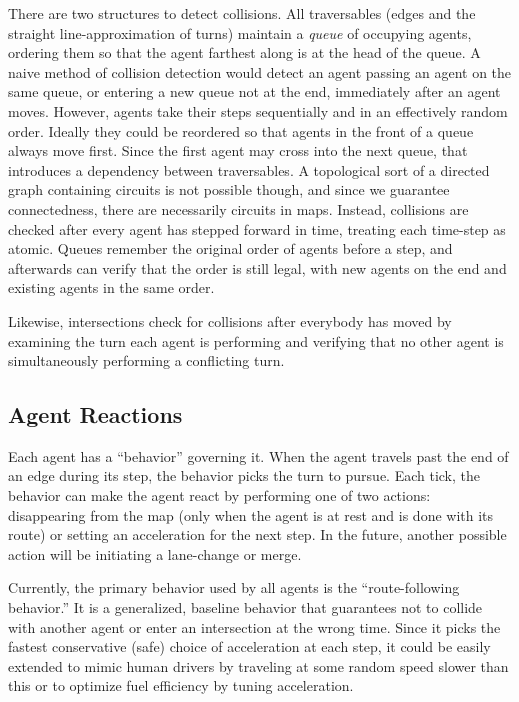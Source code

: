 \documentclass[letterpaper, 10 pt, conference]{ieeeconf}  %
\begin{document}
There are two structures to detect collisions. All traversables (edges and the
straight line-approximation of turns) maintain a \emph{queue} of occupying
agents, ordering them so that the agent farthest along is at the head of the
queue. A naive method of collision detection would detect an agent passing an
agent on the same queue, or entering a new queue not at the end, immediately
after an agent moves. However, agents take their steps sequentially and in an
effectively random order. Ideally they could be reordered so that agents in the
front of a queue always move first. Since the first agent may cross into the
next queue, that introduces a dependency between traversables. A topological
sort of a directed graph containing circuits is not possible though, and since
we guarantee connectedness, there are necessarily circuits in maps.  Instead,
collisions are checked after every agent has stepped forward in time, treating
each time-step as atomic. Queues remember the original order of agents before a
step, and afterwards can verify that the order is still legal, with new agents
on the end and existing agents in the same order.

Likewise, intersections check for collisions after everybody has moved by
examining the turn each agent is performing and verifying that no other agent is
simultaneously performing a conflicting turn.


\subsection{Agent Reactions}

Each agent has a ``behavior'' governing it. When the agent travels past the end
of an edge during its step, the behavior picks the turn to pursue. Each tick,
the behavior can make the agent react by performing one of two actions:
disappearing from the map (only when the agent is at rest and is done with its
route) or setting an acceleration for the next step. In the future, another
possible action will be initiating a lane-change or
merge.

Currently, the primary behavior used by all agents is the ``route-following
behavior.'' It is a generalized, baseline behavior that guarantees not to
collide with another agent or enter an intersection at the wrong time. Since it
picks the fastest conservative (safe) choice of acceleration at each step, it
could be easily extended to mimic human drivers by traveling at some random
speed slower than this or to optimize fuel efficiency by tuning acceleration.
\end{document}
